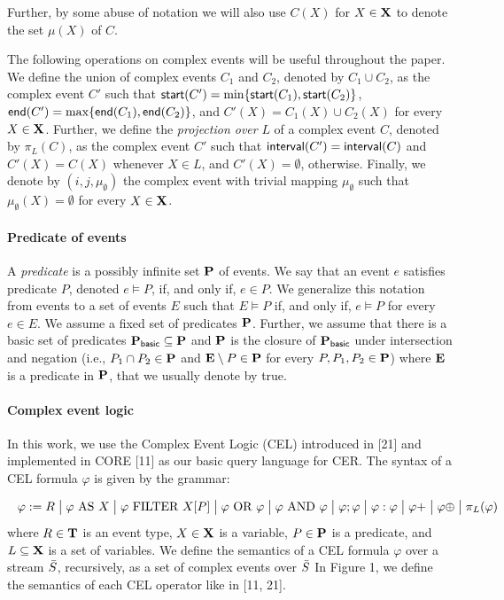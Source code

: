 Further, by some abuse of notation we will also use $C(X)$ for $X \in \mathbf{X}$ to denote the set $\mu(X)$ of $C$.

The following operations on complex events will be useful throughout the paper. We define the union of complex events $C_1$ and $C_2$, denoted by $C_1 \cup C_2$, as the complex event $C'$ such that $\mathsf{start}(C') = \min\{\mathsf{start}(C_1), \mathsf{start}(C_2)\}$, $\mathsf{end}(C') = \max\{\mathsf{end}(C_1), \mathsf{end}(C_2)\}$, and $C'(X) = C_1(X) \cup C_2(X)$ for every $X \in \mathbf{X}$. Further, we define the \textit{projection over} $L$ of a complex event $C$, denoted by $\pi_L(C)$, as the complex event $C'$ such that $\mathsf{interval}(C') = \mathsf{interval}(C)$ and $C'(X) = C(X)$ whenever $X \in L$, and $C'(X) = \emptyset$, otherwise. Finally, we denote by $(i, j, \mu_\emptyset)$ the complex event with trivial mapping $\mu_\emptyset$ such that $\mu_\emptyset(X) = \emptyset$ for every $X \in \mathbf{X}$.

\paragraph{Predicate of events} A \textit{predicate} is a possibly infinite set $\mathbf{P}$ of events. We say that an event $e$ satisfies predicate $P$, denoted $e \vDash P$, if, and only if, $e \in P$. We generalize this notation from events to a set of events $E$ such that $E \vDash P$ if, and only if, $e \vDash P$ for every $e \in E$. We assume a fixed set of predicates $\mathbf{P}$. Further, we assume that there is a basic set of predicates $\mathbf{P}_{\mathsf{basic}} \subseteq \mathbf{P}$ and $\mathbf{P}$ is the closure of $\mathbf{P}_{\mathsf{basic}}$ under intersection and negation (i.e., $P_1 \cap P_2 \in \mathbf{P}$ and $\mathbf{E} \setminus P \in \mathbf{P}$ for every $P, P_1, P_2 \in \mathbf{P}$) where $\mathbf{E}$ is a predicate in $\mathbf{P}$, that we usually denote by true.

\paragraph{Complex event logic} In this work, we use the Complex Event Logic (CEL) introduced in [21] and implemented in CORE [11] as our basic query language for CER. The syntax of a CEL formula $\varphi$ is given by the grammar:

\[
\makebox[\textwidth][s]{$
	\varphi := R \; \big|\; \varphi \text{ AS } X 
	\; \big|\; \varphi \text{ FILTER } X[P]
	\; \big|\; \varphi \text{ OR } \varphi
	\; \big|\; \varphi \text{ AND } \varphi
	\; \big|\; \varphi ; \varphi
	\; \big|\; \varphi : \varphi
	\; \big|\; \varphi{+}
	\; \big|\; \varphi{\oplus}
	\; \big|\; \pi_L(\varphi)
	$}
\]
where $R \in \mathbf{T}$ is an event type, $X \in \mathbf{X}$ is a variable, $P \in \mathbf{P}$ is a predicate, and $L \subseteq \mathbf{X}$ is a set of variables.  We define the semantics of a CEL formula $\varphi$ over a stream $\bar{S}$, recursively, as a set of complex events over $\bar{S}$ In Figure 1, we define the semantics of each CEL operator like in [11, 21].

